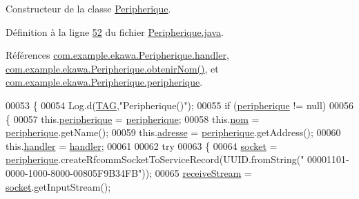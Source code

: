 Constructeur de la classe \hyperlink{classcom_1_1example_1_1ekawa_1_1_peripherique}{Peripherique}. 



Définition à la ligne \hyperlink{_peripherique_8java_source_l00052}{52} du fichier \hyperlink{_peripherique_8java_source}{Peripherique.\+java}.



Références \hyperlink{_peripherique_8java_source_l00047}{com.\+example.\+ekawa.\+Peripherique.\+handler}, \hyperlink{_peripherique_8java_source_l00244}{com.\+example.\+ekawa.\+Peripherique.\+obtenir\+Nom()}, et \hyperlink{_peripherique_8java_source_l00039}{com.\+example.\+ekawa.\+Peripherique.\+peripherique}.


\begin{DoxyCode}
00053     \{
00054         Log.d(\hyperlink{classcom_1_1example_1_1ekawa_1_1_peripherique_a80ad0e52c530c7dc114109ff777ae975}{TAG},\textcolor{stringliteral}{"Peripherique()"});
00055         \textcolor{keywordflow}{if} (\hyperlink{classcom_1_1example_1_1ekawa_1_1_peripherique_ab509bd2180c53845197423813a97f025}{peripherique} != null)
00056         \{
00057             this.\hyperlink{classcom_1_1example_1_1ekawa_1_1_peripherique_ab509bd2180c53845197423813a97f025}{peripherique} = \hyperlink{classcom_1_1example_1_1ekawa_1_1_peripherique_ab509bd2180c53845197423813a97f025}{peripherique};
00058             this.\hyperlink{classcom_1_1example_1_1ekawa_1_1_peripherique_a0fb529bb80d55dd616821bce74a2af8c}{nom} = \hyperlink{classcom_1_1example_1_1ekawa_1_1_peripherique_ab509bd2180c53845197423813a97f025}{peripherique}.getName();
00059             this.\hyperlink{classcom_1_1example_1_1ekawa_1_1_peripherique_a2617309b5112a289fcd9f9570154341c}{adresse} = \hyperlink{classcom_1_1example_1_1ekawa_1_1_peripherique_ab509bd2180c53845197423813a97f025}{peripherique}.getAddress();
00060             this.\hyperlink{classcom_1_1example_1_1ekawa_1_1_peripherique_ab6a0c0cae2eb087315d0d04d1cf6c3dc}{handler} = \hyperlink{classcom_1_1example_1_1ekawa_1_1_peripherique_ab6a0c0cae2eb087315d0d04d1cf6c3dc}{handler};
00061 
00062             \textcolor{keywordflow}{try}
00063             \{
00064                 \hyperlink{classcom_1_1example_1_1ekawa_1_1_peripherique_a00e15bc5bdafff61d45d4e39d7dd21e0}{socket} = \hyperlink{classcom_1_1example_1_1ekawa_1_1_peripherique_ab509bd2180c53845197423813a97f025}{peripherique}.createRfcommSocketToServiceRecord(UUID.fromString(\textcolor{stringliteral}{"
      00001101-0000-1000-8000-00805F9B34FB"}));
00065                 \hyperlink{classcom_1_1example_1_1ekawa_1_1_peripherique_af46a939491178c90c1ecd75dd781f4b6}{receiveStream} = \hyperlink{classcom_1_1example_1_1ekawa_1_1_peripherique_a00e15bc5bdafff61d45d4e39d7dd21e0}{socket}.getInputStream();

\end{DoxyCode}
